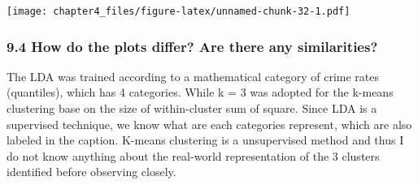 \documentclass[
]{article}
\newenvironment{Shaded}{\begin{snugshade}}{\end{snugshade}}
\newcommand{\AttributeTok}[1]{\textcolor[rgb]{0.77,0.63,0.00}{#1}}
\newcommand{\CommentTok}[1]{\textcolor[rgb]{0.56,0.35,0.01}{\textit{#1}}}
\newcommand{\DecValTok}[1]{\textcolor[rgb]{0.00,0.00,0.81}{#1}}
\newcommand{\FloatTok}[1]{\textcolor[rgb]{0.00,0.00,0.81}{#1}}
\newcommand{\FunctionTok}[1]{\textcolor[rgb]{0.00,0.00,0.00}{#1}}
\newcommand{\NormalTok}[1]{#1}
\newcommand{\OtherTok}[1]{\textcolor[rgb]{0.56,0.35,0.01}{#1}}
\newcommand{\SpecialCharTok}[1]{\textcolor[rgb]{0.00,0.00,0.00}{#1}}
\newcommand{\StringTok}[1]{\textcolor[rgb]{0.31,0.60,0.02}{#1}}
\begin{document}
\begin{Shaded}
\end{Shaded}

\texttt{[image: chapter4\_files/figure-latex/unnamed-chunk-32-1.pdf]}

\hypertarget{how-do-the-plots-differ-are-there-any-similarities}{%
\subsubsection{9.4 How do the plots differ? Are there any
similarities?}\label{how-do-the-plots-differ-are-there-any-similarities}}

The LDA was trained according to a mathematical category of crime rates
(quantiles), which has 4 categories. While k = 3 was adopted for the
k-means clustering base on the size of within-cluster sum of square.
Since LDA is a supervised technique, we know what are each categories
represent, which are also labeled in the caption. K-means clustering is
a unsupervised method and thus I do not know anything about the
real-world representation of the 3 clusters identified before observing
closely.
\end{document}
